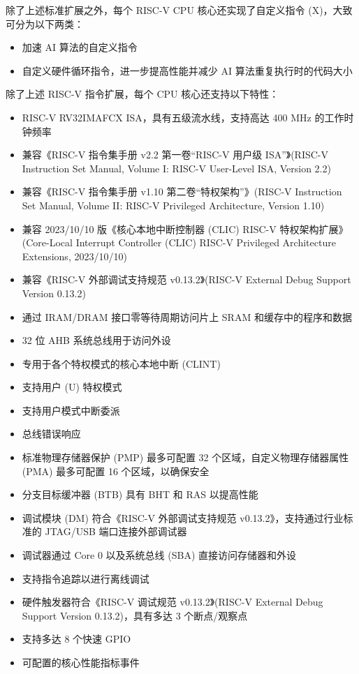 \documentclass[main\_\_CN.tex]{subfiles}
\begin{document}
除了上述标准扩展之外，每个 RISC-V CPU 核心还实现了自定义指令 (X)，大致可分为以下两类：
\begin{itemize}
    \item 加速 AI 算法的自定义指令
    \item 自定义硬件循环指令，进一步提高性能并减少 AI 算法重复执行时的代码大小
\end{itemize}

除了上述 RISC-V 指令扩展，每个 CPU 核心还支持以下特性：
\begin{itemize}
    \item RISC-V RV32IMAFCX ISA，具有五级流水线，支持高达 400 MHz 的工作时钟频率
    \item 兼容《RISC-V 指令集手册 v2.2 第一卷“RISC-V 用户级 ISA”》(RISC-V Instruction Set Manual, Volume I: RISC-V User-Level ISA, Version 2.2)
    \item 兼容《RISC-V 指令集手册 v1.10 第二卷“特权架构”》(RISC-V Instruction Set Manual, Volume II: RISC-V Privileged Architecture, Version 1.10)
    \item 兼容 2023/10/10 版《核心本地中断控制器 (CLIC) RISC-V 特权架构扩展》(Core-Local Interrupt Controller (CLIC) RISC-V Privileged Architecture Extensions, 2023/10/10)
    \item 兼容《RISC-V 外部调试支持规范 v0.13.2》(RISC-V External Debug Support Version 0.13.2)
    \item 通过 IRAM/DRAM 接口零等待周期访问片上 SRAM 和缓存中的程序和数据
    \item 32 位 AHB 系统总线用于访问外设
    \item 专用于各个特权模式的核心本地中断 (CLINT)
    \item 支持用户 (U) 特权模式
    \item 支持用户模式中断委派
    \item 总线错误响应
    \item 标准物理存储器保护 (PMP) 最多可配置 32 个区域，自定义物理存储器属性 (PMA) 最多可配置 16 个区域，以确保安全
    \item 分支目标缓冲器 (BTB) 具有 BHT 和 RAS 以提高性能
    \item 调试模块 (DM) 符合《RISC-V 外部调试支持规范 v0.13.2》，支持通过行业标准的 JTAG/USB 端口连接外部调试器
    \item 调试器通过 Core 0 以及系统总线 (SBA) 直接访问存储器和外设
    \item 支持指令追踪以进行离线调试
    \item 硬件触发器符合《RISC-V 调试规范 v0.13.2》(RISC-V External Debug Support Version 0.13.2)，具有多达 3 个断点/观察点
    \item 支持多达 8 个快速 GPIO
    \item 可配置的核心性能指标事件
\end{itemize}
\end{document}
